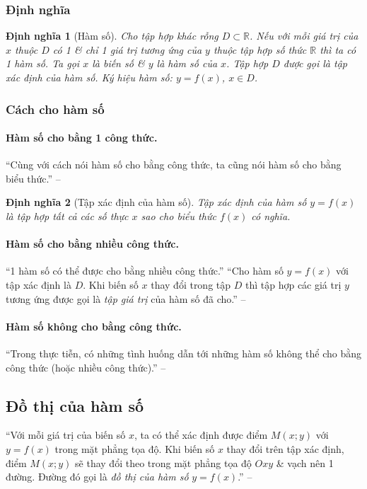 \documentclass[oneside]{book}
\numberwithin{equation}{section}
\newtheorem{dinhnghia}{Định nghĩa}[section]
\begin{document}
\subsubsection{Định nghĩa}

\begin{dinhnghia}[Hàm số]
	Cho tập hợp khác rỗng $D\subset\mathbb{R}$. Nếu với mỗi giá trị của $x$ thuộc $D$ có 1 \& chỉ 1 giá trị tương ứng của $y$ thuộc tập hợp số thức $\mathbb{R}$ thì ta có 1 \emph{hàm số}. Ta gọi $x$ là \emph{biến số} \& $y$ là \emph{hàm số} của $x$. Tập hợp $D$ được gọi là \emph{tập xác định} của hàm số. Ký hiệu hàm số: $y = f(x)$, $x\in D$.
\end{dinhnghia}

\subsubsection{Cách cho hàm số}

\paragraph{Hàm số cho bằng 1 công thức.} ``Cùng với cách nói hàm số cho bằng công thức, ta cũng nói hàm số cho bằng biểu thức.'' -- \cite[p. 32]{SGK_Toan_10_Canh_Dieu_tap_1}

\begin{dinhnghia}[Tập xác định của hàm số]
	\emph{Tập xác định của hàm số} $y = f(x)$ là tập hợp tất cả các số thực $x$ sao cho biểu thức $f(x)$ có nghĩa.
\end{dinhnghia}

\paragraph{Hàm số cho bằng nhiều công thức.} ``1 hàm số có thể được cho bằng nhiều công thức.'' ``Cho hàm số $y = f(x)$ với tập xác định là $D$. Khi biến số $x$ thay đổi trong tập $D$ thì tập hợp các giá trị $y$ tương ứng được gọi là \textit{tập giá trị} của hàm số đã cho.'' -- \cite[p. 33]{SGK_Toan_10_Canh_Dieu_tap_1}

\paragraph{Hàm số không cho bằng công thức.} ``Trong thực tiễn, có những tình huống dẫn tới những hàm số không thể cho bằng công thức (hoặc nhiều công thức).'' -- \cite[p. 33]{SGK_Toan_10_Canh_Dieu_tap_1}

\subsection{Đồ thị của hàm số}
``Với mỗi giá trị của biến số $x$, ta có thể xác định được điểm $M(x;y)$ với $y = f(x)$ trong mặt phẳng tọa độ. Khi biến số $x$ thay đổi trên tập xác định, điểm $M(x;y)$ sẽ thay đổi theo trong mặt phẳng tọa độ $Oxy$ \& vạch nên 1 đường. Đường đó gọi là \textit{đồ thị của hàm số} $y = f(x)$.'' -- \cite[p. 34]{SGK_Toan_10_Canh_Dieu_tap_1}
\end{document}
